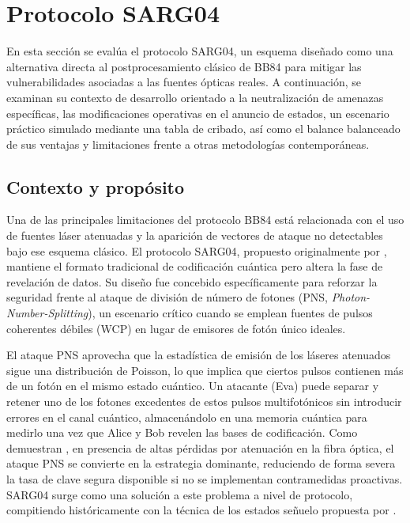 \section{Protocolo SARG04}

En esta sección se evalúa el protocolo SARG04, un esquema diseñado como una alternativa directa al postprocesamiento clásico de BB84 para mitigar las vulnerabilidades asociadas a las fuentes ópticas reales. A continuación, se examinan su contexto de desarrollo orientado a la neutralización de amenazas específicas, las modificaciones operativas en el anuncio de estados, un escenario práctico simulado mediante una tabla de cribado, así como el balance balanceado de sus ventajas y limitaciones frente a otras metodologías contemporáneas.

\subsection{Contexto y propósito}
Una de las principales limitaciones del protocolo BB84 \citep{bennett1984} está relacionada con el uso de fuentes láser atenuadas y la aparición de vectores de ataque no detectables bajo ese esquema clásico. El protocolo SARG04, propuesto originalmente por \cite{scarani2004}, mantiene el formato tradicional de codificación cuántica pero altera la fase de revelación de datos. Su diseño fue concebido específicamente para reforzar la seguridad frente al ataque de división de número de fotones (PNS, \emph{Photon-Number-Splitting}), un escenario crítico cuando se emplean fuentes de pulsos coherentes débiles (WCP) en lugar de emisores de fotón único ideales.

El ataque PNS aprovecha que la estadística de emisión de los láseres atenuados sigue una distribución de Poisson, lo que implica que ciertos pulsos contienen más de un fotón en el mismo estado cuántico. Un atacante (Eva) puede separar y retener uno de los fotones excedentes de estos pulsos multifotónicos sin introducir errores en el canal cuántico, almacenándolo en una memoria cuántica para medirlo una vez que Alice y Bob revelen las bases de codificación. Como demuestran \cite{lutkenhaus2002}, en presencia de altas pérdidas por atenuación en la fibra óptica, el ataque PNS se convierte en la estrategia dominante, reduciendo de forma severa la tasa de clave segura disponible si no se implementan contramedidas proactivas. SARG04 surge como una solución a este problema a nivel de protocolo, compitiendo históricamente con la técnica de los estados señuelo propuesta por \cite{hwang2003}.

